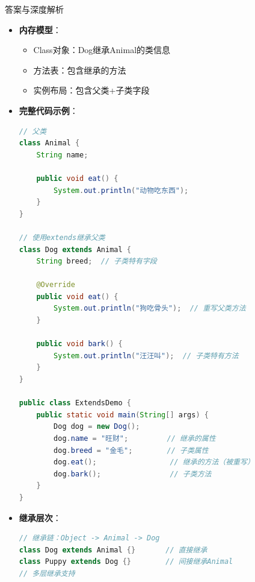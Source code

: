 \documentclass[12pt, a4paper]{ctexart}
\begin{document}
\begin{enumerate}[label=\textbf{\arabic*.}]
\begin{bluebox}{答案与深度解析}
\begin{itemize}[leftmargin=*, nosep, label={}]
\begin{itemize}[label={}, leftmargin=*, nosep]
\begin{lstlisting}[language=Java]
// 字节码（javap -v）
// class Dog extends Animal
// Super class: #2; //class Animal
				      \end{lstlisting}
				            \item \textbf{内存模型}：
				                  \begin{itemize}[label={}, nosep]
					                  \item Class对象：Dog继承Animal的类信息
					                  \item 方法表：包含继承的方法
					                  \item 实例布局：包含父类+子类字段
				                  \end{itemize}
				            \item \textbf{完整代码示例}：
				                  \begin{lstlisting}[language=Java]
// 父类
class Animal {
    String name;

    public void eat() {
        System.out.println("动物吃东西");
    }
}

// 使用extends继承父类
class Dog extends Animal {
    String breed;  // 子类特有字段

    @Override
    public void eat() {
        System.out.println("狗吃骨头");  // 重写父类方法
    }

    public void bark() {
        System.out.println("汪汪叫");  // 子类特有方法
    }
}

public class ExtendsDemo {
    public static void main(String[] args) {
        Dog dog = new Dog();
        dog.name = "旺财";         // 继承的属性
        dog.breed = "金毛";        // 子类属性
        dog.eat();                 // 继承的方法（被重写）
        dog.bark();                // 子类方法
    }
}
				            \end{lstlisting}
				            \item \textbf{继承层次}：
				                  \begin{lstlisting}[language=Java]
// 继承链：Object -> Animal -> Dog
class Dog extends Animal {}       // 直接继承
class Puppy extends Dog {}        // 间接继承Animal
// 多层继承支持
				            \end{lstlisting}
			            \end{itemize}


\end{itemize}
\end{bluebox}
\end{enumerate}
\end{document}
